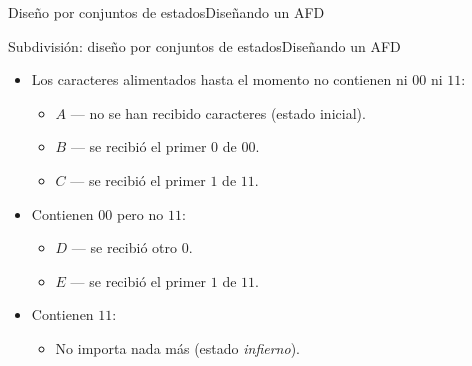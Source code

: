 \documentclass[spanish]{beamer}
\begin{document}
\begin{frame}{Diseño por conjuntos de estados}{Diseñando un AFD}
    \begin{center}
    \end{center}
\end{frame}

\begin{frame}{Subdivisión: diseño por conjuntos de estados}{Diseñando un AFD}
    \begin{itemize}
        \itemsep1.5ex
        \item Los caracteres alimentados hasta el momento no contienen ni $00$ ni $11$: \pause
        \begin{itemize}
            \item $A$ --- no se han recibido caracteres (estado inicial). \pause
            \item $B$ --- se recibió el primer $0$ de $00$. \pause
            \item $C$ --- se recibió el primer $1$ de $11$. \pause
        \end{itemize}
        \item Contienen $00$ pero no $11$: \pause
        \begin{itemize}
            \item $D$ --- se recibió otro $0$. \pause
            \item $E$ --- se recibió el primer $1$ de $11$. \pause
        \end{itemize}
        \item Contienen $11$: \pause
            \begin{itemize}
                \item No importa nada más (estado \textit{infierno}).
            \end{itemize}
    \end{itemize}
\end{frame}
\end{document}
